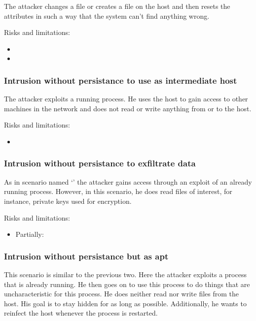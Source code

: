 The attacker changes a file or creates a file on the host and then resets the attributes in such a way that the system can't find anything wrong.

Risks and limitations:
\begin{itemize}
	\item {}
	\item {}
\end{itemize}

\subsubsection{Intrusion without persistance to use as intermediate host}
\label{sec:attack:nopersistanceintermediatehost}

The attacker exploits a running process. He uses the host to gain access to other machines in the network and does not read or write anything from or to the host. 

Risks and limitations:
\begin{itemize}
	\item {}
\end{itemize}

\subsubsection{Intrusion without persistance to exfiltrate data}
\label{sec:attack:nopersistanceexfiltration}

As in scenario named `' the attacker gains access through an exploit of an already running process. However, in this scenario, he does read files of interest, for instance, private keys used for encryption. 

Risks and limitations:
\begin{itemize}
	\item Partially: 
\end{itemize}

\subsubsection{Intrusion without persistance but as \gls{apt}}
\label{sec:attack:nopersistanceapt}

This scenario is similar to the previous two. Here the attacker exploits a process that is already running. He then goes on to use this process to do things that are uncharacteristic for this process. He does neither read nor write files from the host. His goal is to stay hidden for as long as possible. Additionally, he wants to reinfect the host whenever the process is restarted.

